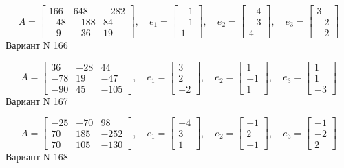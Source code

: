 \documentclass[11pt]{report}
\begin{document}
$$A = \left[\begin{matrix}166 & 648 & -282\\-48 & -188 & 84\\-9 & -36 & 19\end{matrix}\right],\quad e_1 = \left[\begin{matrix}-1\\-1\\1\end{matrix}\right],\quad e_2 = \left[\begin{matrix}-4\\-3\\4\end{matrix}\right],\quad e_3 = \left[\begin{matrix}3\\-2\\-2\end{matrix}\right]$$Вариант N 166

$$A = \left[\begin{matrix}36 & -28 & 44\\-78 & 19 & -47\\-90 & 45 & -105\end{matrix}\right],\quad e_1 = \left[\begin{matrix}3\\2\\-2\end{matrix}\right],\quad e_2 = \left[\begin{matrix}1\\-1\\1\end{matrix}\right],\quad e_3 = \left[\begin{matrix}1\\1\\-3\end{matrix}\right]$$Вариант N 167

$$A = \left[\begin{matrix}-25 & -70 & 98\\70 & 185 & -252\\70 & 105 & -130\end{matrix}\right],\quad e_1 = \left[\begin{matrix}-4\\3\\1\end{matrix}\right],\quad e_2 = \left[\begin{matrix}-1\\2\\-1\end{matrix}\right],\quad e_3 = \left[\begin{matrix}-1\\-2\\2\end{matrix}\right]$$Вариант N 168
\end{document}
